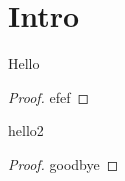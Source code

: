 %

\chapter{Intro}
\begin{definition}[Cylinder ]
    \label{def:cdf}
    \leanok
    
  \end{definition}

\begin{lemma}
    \label{lem:hello}
    Hello
\end{lemma}
\begin{proof}
    efef
\end{proof}

\begin{lemma}
    \label{lem:hello2}
    hello2
\end{lemma}
\begin{proof}
    goodbye
\end{proof}